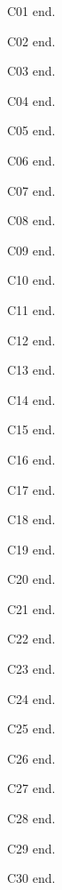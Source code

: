 C01 \cite{s01} end.

C02 \cite{s02} end.

C03 \cite{s03} end.

C04 \cite{s04} end.

C05 \cite{s05} end.

C06 \cite{s06} end.

C07 \cite{s07} end.

C08 \cite{s08} end.

C09 \cite{s09} end.

C10 \cite{s10} end.

C11 \cite{s11} end.

C12 \cite{s12} end.

C13 \cite{s13} end.

C14 \cite{s14} end.

C15 \cite{s15} end.

C16 \cite{s16} end.

C17 \cite{s17} end.

C18 \cite{s18} end.

C19 \cite{s19} end.

C20 \cite{s20} end.

C21 \cite{s21} end.

C22 \cite{s22} end.

C23 \cite{s23} end.

C24 \cite{s24} end.

C25 \cite{s25} end.

C26 \cite{s26} end.

C27 \cite{s27} end.

C28 \cite{s28} end.

C29 \cite{s29} end.

C30 \cite{s30} end.

